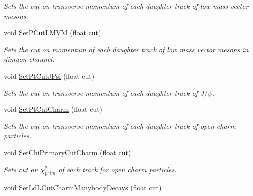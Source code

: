 \begin{DoxyCompactItemize}
\begin{DoxyCompactList}\small\item\em Sets the cut on transverse momentum of each daughter track of low mass vector mesons. \end{DoxyCompactList}\item 
void \hyperlink{classKFParticleFinder_a4f63777d15d4481cff4d2323aa7b17c6}{Set\+P\+Cut\+L\+M\+VM} (float cut)\hypertarget{classKFParticleFinder_a4f63777d15d4481cff4d2323aa7b17c6}{}\label{classKFParticleFinder_a4f63777d15d4481cff4d2323aa7b17c6}

\begin{DoxyCompactList}\small\item\em Sets the cut on momentum of each daughter track of low mass vector mesons in dimuon channel. \end{DoxyCompactList}\item 
void \hyperlink{classKFParticleFinder_ac3ae89d59b8d562ec3125ac2fa5c8700}{Set\+Pt\+Cut\+J\+Psi} (float cut)\hypertarget{classKFParticleFinder_ac3ae89d59b8d562ec3125ac2fa5c8700}{}\label{classKFParticleFinder_ac3ae89d59b8d562ec3125ac2fa5c8700}

\begin{DoxyCompactList}\small\item\em Sets the cut on transverse momentum of each daughter track of $J/\psi$. \end{DoxyCompactList}\item 
void \hyperlink{classKFParticleFinder_a2795e4064aa48a9891f0db3752d806e2}{Set\+Pt\+Cut\+Charm} (float cut)\hypertarget{classKFParticleFinder_a2795e4064aa48a9891f0db3752d806e2}{}\label{classKFParticleFinder_a2795e4064aa48a9891f0db3752d806e2}

\begin{DoxyCompactList}\small\item\em Sets the cut on transverse momentum of each daughter track of open charm particles. \end{DoxyCompactList}\item 
void \hyperlink{classKFParticleFinder_a1bd49aabbff88131fffa721a79e56b6d}{Set\+Chi\+Primary\+Cut\+Charm} (float cut)\hypertarget{classKFParticleFinder_a1bd49aabbff88131fffa721a79e56b6d}{}\label{classKFParticleFinder_a1bd49aabbff88131fffa721a79e56b6d}

\begin{DoxyCompactList}\small\item\em Sets cut on $\chi^2_{prim}$ of each track for open charm particles. \end{DoxyCompactList}\item 
void \hyperlink{classKFParticleFinder_a5afbb1d578d9615d611c6008264b46fe}{Set\+Ld\+L\+Cut\+Charm\+Manybody\+Decays} (float cut)\hypertarget{classKFParticleFinder_a5afbb1d578d9615d611c6008264b46fe}{}\label{classKFParticleFinder_a5afbb1d578d9615d611c6008264b46fe}


\end{DoxyCompactItemize}
